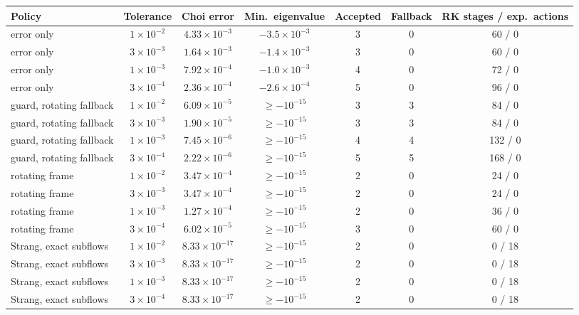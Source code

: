 \begin{tabular}{@{}lcccccc@{}}
\toprule
Policy & Tolerance & Choi error & Min.\ eigenvalue & Accepted & Fallback & RK stages / exp.\ actions \\
\midrule
error only & $1\times10^{-2}$ & $4.33\times10^{-3}$ & $-3.5\times10^{-3}$ & 3 & 0 & 60 / 0 \\
error only & $3\times10^{-3}$ & $1.64\times10^{-3}$ & $-1.4\times10^{-3}$ & 3 & 0 & 60 / 0 \\
error only & $1\times10^{-3}$ & $7.92\times10^{-4}$ & $-1.0\times10^{-3}$ & 4 & 0 & 72 / 0 \\
error only & $3\times10^{-4}$ & $2.36\times10^{-4}$ & $-2.6\times10^{-4}$ & 5 & 0 & 96 / 0 \\
guard, rotating fallback & $1\times10^{-2}$ & $6.09\times10^{-5}$ & $\ge-10^{-15}$ & 3 & 3 & 84 / 0 \\
guard, rotating fallback & $3\times10^{-3}$ & $1.90\times10^{-5}$ & $\ge-10^{-15}$ & 3 & 3 & 84 / 0 \\
guard, rotating fallback & $1\times10^{-3}$ & $7.45\times10^{-6}$ & $\ge-10^{-15}$ & 4 & 4 & 132 / 0 \\
guard, rotating fallback & $3\times10^{-4}$ & $2.22\times10^{-6}$ & $\ge-10^{-15}$ & 5 & 5 & 168 / 0 \\
rotating frame & $1\times10^{-2}$ & $3.47\times10^{-4}$ & $\ge-10^{-15}$ & 2 & 0 & 24 / 0 \\
rotating frame & $3\times10^{-3}$ & $3.47\times10^{-4}$ & $\ge-10^{-15}$ & 2 & 0 & 24 / 0 \\
rotating frame & $1\times10^{-3}$ & $1.27\times10^{-4}$ & $\ge-10^{-15}$ & 2 & 0 & 36 / 0 \\
rotating frame & $3\times10^{-4}$ & $6.02\times10^{-5}$ & $\ge-10^{-15}$ & 3 & 0 & 60 / 0 \\
Strang, exact subflows & $1\times10^{-2}$ & $8.33\times10^{-17}$ & $\ge-10^{-15}$ & 2 & 0 & 0 / 18 \\
Strang, exact subflows & $3\times10^{-3}$ & $8.33\times10^{-17}$ & $\ge-10^{-15}$ & 2 & 0 & 0 / 18 \\
Strang, exact subflows & $1\times10^{-3}$ & $8.33\times10^{-17}$ & $\ge-10^{-15}$ & 2 & 0 & 0 / 18 \\
Strang, exact subflows & $3\times10^{-4}$ & $8.33\times10^{-17}$ & $\ge-10^{-15}$ & 2 & 0 & 0 / 18 \\
\bottomrule
\end{tabular}
